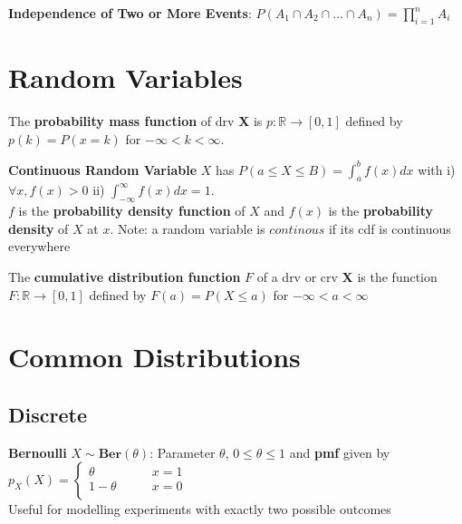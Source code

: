 \documentclass[5pt]{article}
\begin{document}
\begin{definition}
\textbf{Independence of Two or More Events}: $P(A_1\cap A_2 \cap \dots \cap A_n) = \prod^n_{i=1}A_i$
\end{definition}

\section{Random Variables}
\begin{definition}
The \textbf{probability mass function} of drv \textbf{X} is $p: \mathbb{R} \to [0,1]$ defined by $p(k) = P(x=k)$ for $-\infty < k < \infty$.
\end{definition}

\begin{definition}
\textbf{Continuous Random Variable} $X$ has $P(a\leq X \leq B) = \int^b_a f(x) dx$ with i) $\forall x, f(x) > 0$ ii) $\int^\infty_{-\infty}f(x)dx = 1$.\\
$f$ is the \textbf{probability density function} of $X$ and $f(x)$ is the \textbf{probability density} of $X$ at $x$. Note: a random variable is $continous$ if its cdf is continuous everywhere
\end{definition}

\begin{definition}
The \textbf{cumulative distribution function} $F$ of a drv or crv \textbf{X} is the function $F: \mathbb{R}\to [0,1]$ defined by $F(a) = P(X \leq a)$ for $-\infty < a < \infty$
\end{definition}

\section{Common Distributions}
\subsection{Discrete}
\begin{definition}
\textbf{Bernoulli} $X \sim \textbf{Ber}(\theta)$: Parameter $\theta$, $0 \leq \theta \leq 1$ and \textbf{pmf} given by
$
p_X(X)=
\begin{cases}
\theta &\qquad x = 1\\
1 - \theta &\qquad x = 0\\ 
\end{cases}$\\
Useful for modelling experiments with exactly two possible outcomes
\end{definition}
\end{document}
